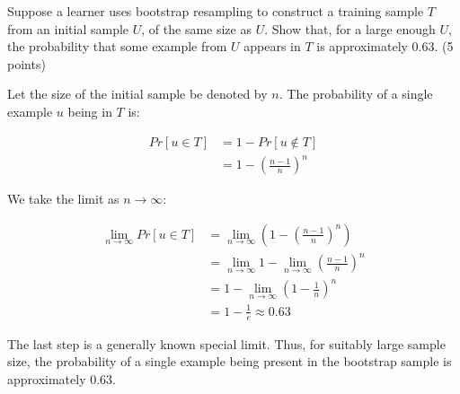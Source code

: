 \documentclass[fleqn]{homework}
\begin{document}
  \begin{problem}{4}
    \begin{question}
      Suppose a learner uses bootstrap resampling to construct a training sample
      $T$ from an initial sample $U$, of the same size as $U$. Show that, for a
      large enough $U$, the probability that some example from $U$ appears in
      $T$ is approximately 0.63. (5 points)
    \end{question}

    Let the size of the initial sample be denoted by $n$.  The probability of a
    single example $u$ being in $T$ is:

    \begin{align*}
      Pr[u \in T] &= 1 - Pr[u \not\in T] \\
      &= 1 - \left(\frac{n-1}{n}\right)^n
    \end{align*}

    We take the limit as $n\to\infty$:

    \begin{align*}
      \lim_{n\to\infty} Pr[u \in T]
      &= \lim_{n\to\infty} \left(1 - \left(\frac{n-1}{n}\right)^n\right) \\
      &= \lim_{n\to\infty} 1 -  \lim_{n\to\infty}\left(\frac{n-1}{n}\right)^n \\
      &= 1 - \lim_{n\to\infty}\left(1 - \frac{1}{n}\right)^n \\
      &= 1 - \frac{1}{e} \approx 0.63
    \end{align*}

    The last step is a generally known special limit.  Thus, for suitably large
    sample size, the probability of a single example being present in the
    bootstrap sample is approximately 0.63.
  \end{problem}
\end{document}
